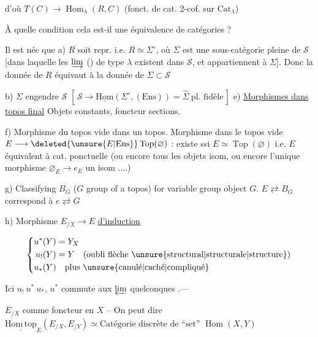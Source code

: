 d'où $T(C)\to\operatorname{Hom}_{\lambda}(R,C)$ (fonct. de cat. 2-cof. sur $\mathrm{Cat}_\lambda$)

À quelle condition cela est-il une équivalence de catégories ?

Il est néc que a) $R$ soit  repr. i.e. $R\simeq\Sigma^\circ$, où $\Sigma$ est une sous-catégorie pleine de $\mathscr S$ [dans laquelle les $\varinjlim$ () de type $\lambda$ existent dans $\mathscr S$, et appartiennent à $\Sigma$]. Donc la donnée de $R$ équivaut à la donnée de $\Sigma\subset\mathscr S$

b) $\Sigma$ engendre $\mathscr S$ $[\,\mathscr S\to\underline{\mathrm{Hom}}(\Sigma^\circ,(\mathrm{Ens}))=\widehat\Sigma\ \text{pl. fidèle}\,]$
e) \uline{Morphismes dans topos final}  Objets constants, foncteur sections.

f) Morphisme du topos vide dans un topos. Morphisme dans le topos vide $E\longrightarrow\deleted{\unsure{E|\mathrm{Ens}}}\operatorname{Top}(\varnothing)$  : existe ssi $E\simeq\operatorname{Top}(\varnothing)$ i.e. $E$ équivalent à cat. ponctuelle (ou encore tous les objets isom, ou encore l'unique morphisme $\varnothing_E\to e_E$ un isom ....)

g) Classifying $B_G$ ($G$ group of a topos) for variable group object $G$. $E\rightleftarrows B_G$ correspond à $e\rightleftarrows G$

h) Morphisme $E_{/X}\longrightarrow E$ \uline{d'induction}



\[\left\{\begin{aligned}u^*(Y)&=Y_X\\u_!(Y)&=Y\quad(\text{oubli flèche \unsure{structural|structurale|structure}})\\u_*(Y)&\quad\text{plus \unsure{canulé|caché|compliqué}}\end{aligned}\right.\]

Ici  $u_!\ u^*\ u_*$, $u^*$ commute aux $\varprojlim$ quelconques .---

$E_{/X}$ \deleted{\unsure{--}} comme foncteur en $X$ -- On peut dire $\underline{\mathrm{Hom\,top}}_E(E_{/X},E_{/Y})\simeq\text{Catégorie discrète de ``set'' }\operatorname{Hom}(X,Y)$


